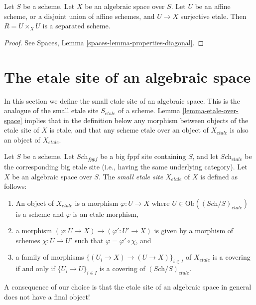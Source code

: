 \begin{lemma}
\label{lemma-algebraic-space-affine-cover}
Let $S$ be a scheme.
Let $X$ be an algebraic space over $S$.
Let $U$ be an affine scheme, or a disjoint union of affine schemes,
and $U \to X$ surjective etale.
Then $R = U \times_X U$ is a separated scheme.
\end{lemma}

\begin{proof}
See Spaces, Lemma \ref{spaces-lemma-properties-diagonal}.
\end{proof}



\section{The etale site of an algebraic space}
\label{section-etale-site}

\noindent
In this section we define the small etale site of an algebraic space.
This is the analogue of the small etale site $S_{etale}$ of a scheme.
Lemma \ref{lemma-etale-over-space} implies that in the definition below
any morphism between objects of the etale site of $X$ is etale, and that
any scheme etale over an object of $X_{etale}$ is also an object of
$X_{etale}$.

\begin{definition}
\label{definition-etale-site}
Let $S$ be a scheme.
Let $\textit{Sch}_{fppf}$ be a big fppf site containing $S$,
and let $\textit{Sch}_{etale}$ be the corresponding big etale site
(i.e., having the same underlying category).
Let $X$ be an algebraic space over $S$.
The {\it small etale site $X_{etale}$} of $X$ is defined as follows:
\begin{enumerate}
\item An object of $X_{etale}$ is a morphism $\varphi : U \to X$
where $U \in \text{Ob}((\textit{Sch}/S)_{etale})$ is a scheme and
$\varphi$ is an etale morphism,
\item a morphism $(\varphi : U \to X) \to (\varphi' : U' \to X)$
is given by a morphism of schemes $\chi : U \to U'$ such that
$\varphi = \varphi' \circ \chi$, and
\item a family of morphisms $\{(U_i \to X) \to (U \to X)\}_{i \in I}$
of $X_{etale}$ is a covering if and only if $\{U_i \to U\}_{i \in I}$
is a covering of $(\textit{Sch}/S)_{etale}$.
\end{enumerate}
\end{definition}

\noindent
A consequence of our choice is that the etale site of an algebraic space
in general does not have a final object!

